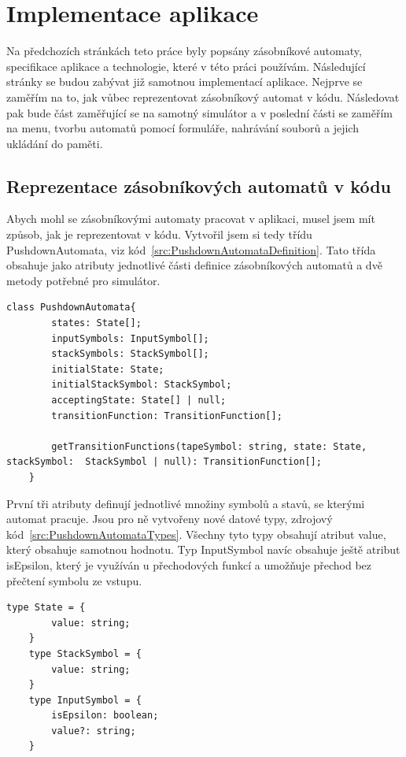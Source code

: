 \chapter{Implementace aplikace}

Na předchozích stránkách teto práce byly popsány zásobníkové automaty, specifikace aplikace a technologie, které v této práci používám. Následující stránky se budou zabývat již samotnou implementací aplikace. Nejprve se zaměřím na to, jak vůbec reprezentovat zásobníkový automat v kódu. Následovat pak bude část zaměřující se na samotný simulátor a v poslední části se zaměřím na menu, tvorbu automatů pomocí formuláře, nahrávání souborů a jejich ukládání do paměti.

\section{Reprezentace zásobníkových automatů v kódu}

Abych mohl se zásobníkovými automaty pracovat v aplikaci, musel jsem mít způsob, jak je reprezentovat v kódu. Vytvořil jsem si tedy třídu PushdownAutomata, viz kód~\ref{src:PushdownAutomataDefinition}. Tato třída obsahuje jako atributy jednotlivé části definice zásobníkových automatů a dvě metody potřebné pro simulátor.

\begin{lstlisting}[label=src:PushdownAutomataDefinition, caption={Deklarce třídy PushdownAutomata}]
    class PushdownAutomata{
        states: State[];
        inputSymbols: InputSymbol[];
        stackSymbols: StackSymbol[];
        initialState: State;
        initialStackSymbol: StackSymbol;
        acceptingState: State[] | null;
        transitionFunction: TransitionFunction[];

        getTransitionFunctions(tapeSymbol: string, state: State, stackSymbol:  StackSymbol | null): TransitionFunction[];
    }
\end{lstlisting}

První tři atributy definují jednotlivé množiny symbolů a stavů, se kterými automat pracuje. Jsou pro ně vytvořeny nové datové typy, zdrojový kód~\ref{src:PushdownAutomataTypes}. Všechny tyto typy obsahují atribut value, který obsahuje samotnou hodnotu. Typ InputSymbol navíc obsahuje ještě atribut isEpsilon, který je využíván u přechodových funkcí a umožňuje přechod bez přečtení symbolu ze vstupu.

\begin{lstlisting}[label=src:PushdownAutomataTypes, caption={Datové typ State, StackSymbol, InputSymbol}]
    type State = {
        value: string;
    }
    type StackSymbol = {
        value: string;
    }
    type InputSymbol = {
        isEpsilon: boolean;
        value?: string;
    }
\end{lstlisting}

